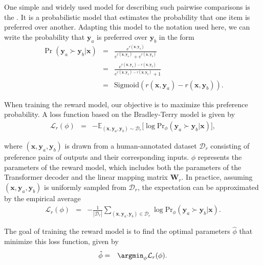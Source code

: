One simple and widely used model for describing such pairwise comparisons is the  \cite{bradley-and-terry:rank}. It is a probabilistic model that estimates the probability that one item is preferred over another. Adapting this model to the notation used here, we can write the probability that $\mathbf{y}_a$ is preferred over $\mathbf{y}_b$ in the form
\begin{eqnarray}
\Pr(\mathbf{y}_a \succ \mathbf{y}_b | \mathbf{x}) & = & \frac{e^{r(\mathbf{x},\mathbf{y}_a)}}{e^{r(\mathbf{x},\mathbf{y}_a)} + e^{r(\mathbf{x},\mathbf{y}_b)}} \nonumber \\
                                                  & = & \frac{e^{r(\mathbf{x},\mathbf{y}_a)-r(\mathbf{x},\mathbf{y}_b)}}{e^{r(\mathbf{x},\mathbf{y}_a)-r(\mathbf{x},\mathbf{y}_b)}+1} \nonumber \\
                                                  & = & \mathrm{Sigmoid}(r(\mathbf{x},\mathbf{y}_a)-r(\mathbf{x},\mathbf{y}_b)).
\end{eqnarray}

When training the reward model, our objective is to maximize this preference probability. A loss function based on the Bradley-Terry model is given by
\begin{eqnarray}
\mathcal{L}_r(\phi) & = & -\mathbb{E}_{(\mathbf{x},\mathbf{y}_a,\mathbf{y}_b) \sim \mathcal{D}_r} \big[ \log \mathrm{Pr}_{\phi}(\mathbf{y}_a \succ \mathbf{y}_b | \mathbf{x}) \big], \label{eq:pairwise-reward-loss-expectation}
\end{eqnarray}

\noindent where $(\mathbf{x},\mathbf{y}_a,\mathbf{y}_b)$ is drawn from a human-annotated dataset $\mathcal{D}_r$ consisting of preference pairs of outputs and their corresponding inputs. $\phi$ represents the parameters of the reward model, which includes both the parameters of the Transformer decoder and the linear mapping matrix $\mathbf{W}_r$. In practice, assuming $(\mathbf{x},\mathbf{y}_a,\mathbf{y}_b)$ is uniformly sampled from $\mathcal{D}_r$, the expectation can be approximated by the empirical average
\begin{eqnarray}
\mathcal{L}_r(\phi) & = & -\frac{1}{|\mathcal{D}_r|} \sum_{(\mathbf{x},\mathbf{y}_a,\mathbf{y}_b) \in \mathcal{D}_r} \log \mathrm{Pr}_{\phi}(\mathbf{y}_a \succ \mathbf{y}_b | \mathbf{x}). \label{eq:pairwise-reward-loss-sum}
\end{eqnarray}

The goal of training the reward model is to find the optimal parameters $\hat{\phi}$ that minimize this loss function, given by
\begin{eqnarray}
\hat{\phi} & = & \argmin_{\phi} \mathcal{L}_r(\phi).
\end{eqnarray}

